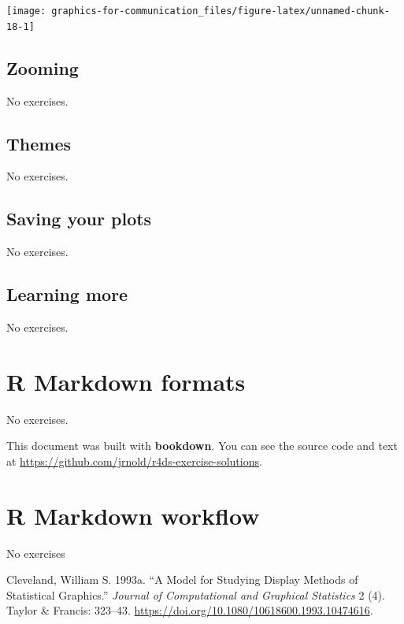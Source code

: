 \documentclass[]{book}
\theoremstyle{plain}
\theoremstyle{remark}
\begin{document}
\begin{center}\texttt{[image: graphics-for-communication\_files/figure-latex/unnamed-chunk-18-1]} \end{center}

\hypertarget{zooming}{%
\section{Zooming}\label{zooming}}

No exercises.

\hypertarget{themes}{%
\section{Themes}\label{themes}}

No exercises.

\hypertarget{saving-your-plots}{%
\section{Saving your plots}\label{saving-your-plots}}

No exercises.

\hypertarget{learning-more-2}{%
\section{Learning more}\label{learning-more-2}}

No exercises.

\hypertarget{r-markdown-formats}{%
\chapter{R Markdown formats}\label{r-markdown-formats}}

No exercises.

This document was built with \textbf{bookdown}. You can see the source code and text at \url{https://github.com/jrnold/r4ds-exercise-solutions}.

\hypertarget{r-markdown-workflow}{%
\chapter{R Markdown workflow}\label{r-markdown-workflow}}

No exercises

\hypertarget{refs}{}
\leavevmode\hypertarget{ref-Cleveland1993a}{}%
Cleveland, William S. 1993a. ``A Model for Studying Display Methods of Statistical Graphics.'' \emph{Journal of Computational and Graphical Statistics} 2 (4). Taylor \& Francis: 323--43. \url{https://doi.org/10.1080/10618600.1993.10474616}.
\end{document}
